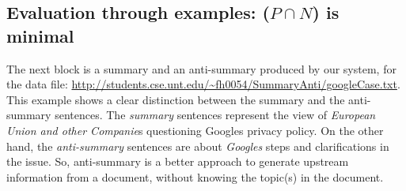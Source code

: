\documentclass[a4paper]{report}
\begin{document}
\subsection{Evaluation through examples: ($P\cap N$) is minimal}
\par The next block is a summary and an anti-summary produced by our system, for the data file: \url{http://students.cse.unt.edu/~fh0054/SummaryAnti/googleCase.txt}.
This example shows a clear distinction between the summary and the anti-summary sentences. The {\em summary} sentences represent the view of \emph{European Union and other Companie}s questioning Googles privacy policy. On the other hand, the {\em anti-summary} sentences are about \emph{Googles} steps and clarifications in the issue. So, anti-summary is a better approach to generate upstream information from  a document, without knowing the topic(s) in the document. 
 \vspace{-0.1in}
\label{ken}
\end{document}
